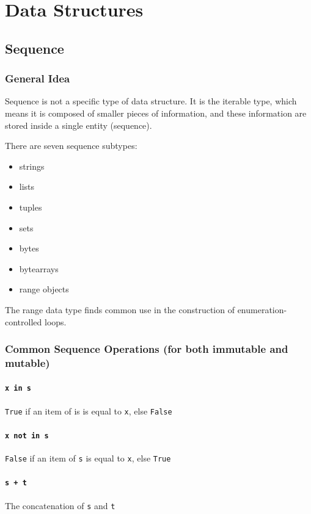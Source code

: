\documentclass[12pt]{book}
\begin{document}
\chapter{Data Structures}
\label{sec:org545509c}
\section{Sequence}
\label{sec:orgd40c18e}
\subsection{General Idea}
\label{sec:org853160d}
Sequence is not a specific type of data structure. It is the iterable type, which means it is composed of smaller pieces of information, and these information are stored inside a single entity (sequence).

There are seven sequence subtypes:
\begin{itemize}
\item strings
\item lists
\item tuples
\item sets
\item bytes
\item bytearrays
\item range objects
\end{itemize}

The range data type finds common use in the construction of enumeration-controlled loops.
\subsection{Common Sequence Operations (for both immutable and mutable)}
\label{sec:org01cf695}
\subsubsection{\texttt{x in s}}
\label{sec:org7e94090}
\texttt{True} if an item of is is equal to \texttt{x}, else \texttt{False}
\subsubsection{\texttt{x not in s}}
\label{sec:org8d5b994}
\texttt{False} if an item of \texttt{s} is equal to \texttt{x}, else \texttt{True}
\subsubsection{\texttt{s + t}}
\label{sec:org7943d8b}
The concatenation of \texttt{s} and \texttt{t}
\end{document}
